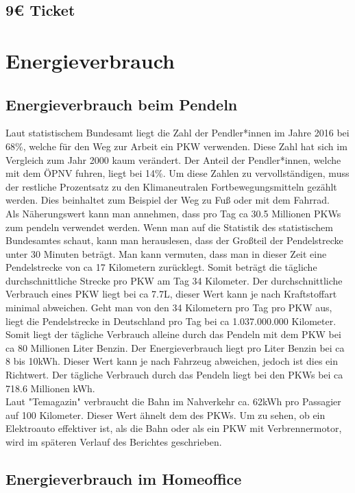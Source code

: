 \documentclass[a4paper,12pt]{scrartcl}
\begin{document}
\subsection{9€ Ticket}
\section{Energieverbrauch}
\subsection{Energieverbrauch beim Pendeln}
Laut statistischem Bundesamt liegt die Zahl der Pendler*innen im Jahre 2016 bei 68\%, welche für den Weg zur Arbeit ein PKW verwenden. Diese Zahl hat sich im Vergleich zum Jahr 2000 kaum verändert. Der Anteil der Pendler*innen, welche mit dem ÖPNV fuhren, liegt bei 14\%. Um diese Zahlen zu vervollständigen, muss der restliche Prozentsatz zu den Klimaneutralen Fortbewegungsmitteln gezählt werden. Dies beinhaltet zum Beispiel der Weg zu Fuß oder mit dem Fahrrad.\\
Als Näherungswert kann man annehmen, dass pro Tag ca 30.5 Millionen PKWs zum pendeln verwendet werden. Wenn man auf die Statistik des statistischem Bundesamtes schaut, kann man herauslesen, dass der Großteil der Pendelstrecke unter 30 Minuten beträgt. Man kann vermuten, dass man in dieser Zeit eine Pendelstrecke von ca 17 Kilometern zurücklegt. Somit beträgt die tägliche durchschnittliche Strecke pro PKW am Tag 34 Kilometer. Der durchschnittliche Verbrauch eines PKW liegt bei ca 7.7L, dieser Wert kann je nach Kraftstoffart minimal abweichen. Geht man von den 34 Kilometern pro Tag pro PKW aus, liegt die Pendelstrecke in Deutschland pro Tag bei ca 1.037.000.000 Kilometer. Somit liegt der tägliche Verbrauch alleine durch das Pendeln mit dem PKW bei ca 80 Millionen Liter Benzin.
Der Energieverbrauch liegt pro Liter Benzin bei ca 8 bis 10kWh. Dieser Wert kann je nach Fahrzeug abweichen, jedoch ist dies ein Richtwert. Der tägliche Verbrauch durch das Pendeln liegt bei den PKWs bei ca 718.6 Millionen kWh.\\
Laut "Temagazin" verbraucht die Bahn im Nahverkehr ca. 62kWh pro Passagier auf 100 Kilometer. Dieser Wert ähnelt dem des PKWs. Um zu sehen, ob ein Elektroauto effektiver ist, als die Bahn oder als ein PKW mit Verbrennermotor, wird im späteren Verlauf des Berichtes geschrieben.


\subsection{Energieverbrauch im Homeoffice}
\end{document}
